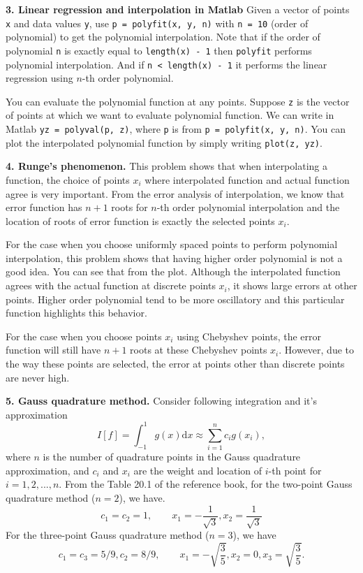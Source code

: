 \documentclass[11pt,a4paper]{article}
\newcommand{\dd}{\mathrm{d}}
\begin{document}
\vspace{10pt}
\noindent\textbf{3. Linear regression and interpolation in Matlab} Given a vector of points \texttt{x} and data values \texttt{y}, use \texttt{p = polyfit(x, y, n)} with \texttt{n = 10}  (order of polynomial) to get the polynomial interpolation. Note that if the order of polynomial \texttt{n} is exactly equal to \texttt{length(x) - 1} then \texttt{polyfit} performs polynomial interpolation. And if \texttt{n < length(x) - 1} it performs the linear regression using $n$-th order polynomial. 

You can evaluate the polynomial function at any points. Suppose \texttt{z} is the vector of points at which we want to evaluate polynomial function. We can write in Matlab \texttt{yz = polyval(p, z)}, where \texttt{p} is from \texttt{p = polyfit(x, y, n)}. You can plot the interpolated polynomial function by simply writing \texttt{plot(z, yz)}.

\vspace{10pt}
\noindent\textbf{4. Runge's phenomenon.} This problem shows that when interpolating a function, the choice of points $x_i$ where interpolated function and actual function agree is very important. From the error analysis of interpolation, we know that error function has $n+1$ roots for $n$-th order polynomial interpolation and the location of roots of error function is exactly the selected points $x_i$.

For the case when you choose uniformly spaced points to perform polynomial interpolation, this problem shows that having higher order polynomial is not a good idea. You can see that from the plot. Although the interpolated function agrees with the actual function at discrete points $x_i$, it shows large errors at other points. Higher order polynomial tend to be more oscillatory and this particular function highlights this behavior. 

For the case when you choose points $x_i$ using Chebyshev points, the error function will still have $n+1$ roots at these Chebyshev points $x_i$. However, due to the way these points are selected, the error at points other than discrete points are never high. 

\vspace{10pt}
\noindent\textbf{5. Gauss quadrature method.} Consider following integration and it's approximation
\begin{equation}\label{eq:Gauss}
I[f] = \int_{-1}^1 g(x) \dd x \approx \sum_{i=1}^n c_i g(x_i),
\end{equation}
where $n$ is the number of quadrature points in the Gauss quadrature approximation, and $c_i$ and $x_i$ are the weight and location of  $i$-th point for $i=1, 2, ..., n$. From the Table 20.1 of the reference book, for the two-point Gauss quadrature method ($n=2$), we have.
\begin{equation}
c_1 = c_2 = 1, \qquad x_1 = -\frac{1}{\sqrt{3}}, x_2 = \frac{1}{\sqrt{3}}
\end{equation}
For the three-point Gauss quadrature method ($n=3$), we have
\begin{equation}
c_1 = c_3 = 5/9, c_2 = 8/9, \qquad x_1 = -\sqrt{\frac{3}{5}}, x_2 = 0, x_3 = \sqrt{\frac{3}{5}} .
\end{equation}
\end{document}
